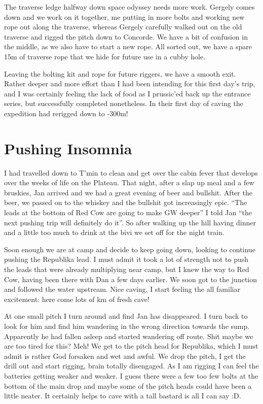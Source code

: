 The traverse ledge halfway down space odyssey needs more work. Gergely
comes down and we work on it together, me putting in more bolts and
working new rope out along the traverse, whereas Gergely carefully
walked out on the old traverse and rigged the pitch down to Concorde. We
have a bit of confusion in the middle, as we also have to start a new
rope. All sorted out, we have a spare 15m of traverse rope that we hide
for future use in a cubby hole.

Leaving the bolting kit and rope for future riggers, we have a smooth
exit. Rather deeper and more effort than I had been intending for this
first day's trip, and I was certainly feeling the lack of food as I
prussic'ed back up the entrance series, but successfully completed
nonetheless. In their first day of caving the expedition had rerigged
down to -300m!


\section{Pushing Insomnia}\label{pushing-insomnia}

I had travelled down to T'min to clean and get over the cabin fever that
develops over the weeks of life on the Plateau. That night, after a slap
up meal and a few bruskies, Jan arrived and we had a great evening of
beer and bullshit. After the beer, we passed on to the whiskey and the
bullshit got increasingly epic. ``The leads at the bottom of Red Cow are
going to make GW deeper'' I told Jan ``the next pushing trip will
definitely do it''. So after walking up the hill having dinner and a
little too much to drink at the bivi we set off for the night train.

Soon enough we are at camp and decide to keep going down, looking to
continue pushing the Republika lead. I must admit it took a lot of
strength not to push the leads that were already multiplying near camp,
but I knew the way to Red Cow, having been there with Dan a few days
earlier. We soon got to the junction and followed the water upstream.
Nice caving, I start feeling the all familiar excitement: here come lots
of km of fresh cave!

At one small pitch I turn around and find Jan has disappeared. I turn
back to look for him and find him wandering in the wrong direction
towards the sump. Apparently he had fallen asleep and started wandering
off route. Shit maybe we are too tired for this? Meh! We get to the
pitch head for Republika, which I must admit is rather God forsaken and
wet and awful. We drop the pitch, I get the drill out and start rigging,
brain totally disengaged. As I am rigging I can feel the batteries
getting weaker and weaker. I guess there were a few too few bolts at the
bottom of the main drop and maybe some of the pitch heads could have
been a little neater. It certainly helps to cave with a tall bastard is
all I can say :D.

